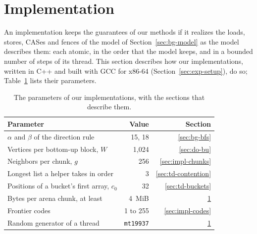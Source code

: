 \section{Implementation}
\label{sec:impl}

An implementation keeps the guarantees of our methods if it realizes the loads, stores, CASes and fences of the model of Section~\ref{sec:bg-model} as the model describes them: each atomic, in the order that the model keeps, and in a bounded number of steps of its thread. This section describes how our implementations, written in C++ and built with GCC for x86-64 (Section~\ref{sec:exp-setup}), do so; Table~\ref{tab:params} lists their parameters.

\begin{table}
    \caption{The parameters of our implementations, with the sections that describe them.}
    \label{tab:params}
    \small
    \begin{tabular}{l r r}
        \toprule
        Parameter & Value & Section \\
        \midrule
        $\alpha$ and $\beta$ of the direction rule & 15, 18 & \ref{sec:bg-bfs} \\
        Vertices per bottom-up block, $W$ & 1,024 & \ref{sec:do-bu} \\
        Neighbors per chunk, $g$ & 256 & \ref{sec:impl-chunks} \\
        Longest list a helper takes in order & 3 & \ref{sec:td-contention} \\
        Positions of a bucket's first array, $c_0$ & 32 & \ref{sec:td-buckets} \\
        Bytes per arena chunk, at least & 4~MiB & \ref{sec:impl} \\
        Frontier codes & 1 to 255 & \ref{sec:impl-codes} \\
        Random generator of a thread & \texttt{mt19937} & \ref{sec:impl} \\
        \bottomrule
    \end{tabular}
\end{table}

